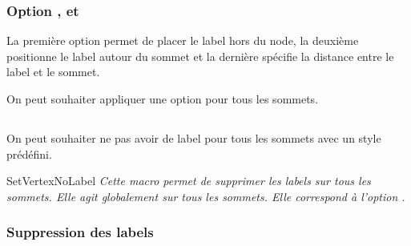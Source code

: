 \begin{tkzexample}[latex=7cm,small]
\end{tkzexample} 

\subsubsection{Option ,  et }

La première option permet de placer le label hors du node, la deuxième positionne le label autour du sommet et la dernière spécifie la distance entre le label et le sommet.

\begin{tkzexample}[latex=7cm,small]
\end{tkzexample}  


\vfill\newpage 
On peut souhaiter appliquer une option pour tous les sommets.  

\subsection{}
On peut souhaiter ne pas avoir de label pour tous les sommets avec un style prédéfini. 

\begin{NewMacroBox}{SetVertexNoLabel}{}
\emph{ Cette macro permet de supprimer les labels sur tous les sommets. Elle agit globalement sur tous les sommets. Elle correspond à l'option  .}
\end{NewMacroBox}
 
\subsubsection{Suppression des labels} 

\begin{tkzexample}[vbox]
\end{tkzexample}   



